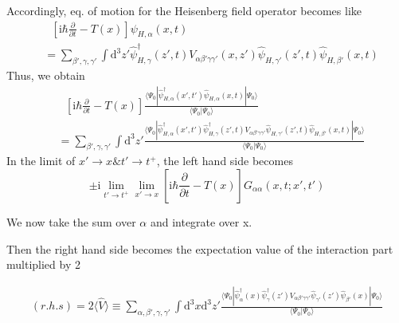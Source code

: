 Accordingly, eq. of motion for the Heisenberg field operator becomes like 
\begin{align}
&\ \ \ [\mathrm{i}\hbar\frac{\partial}{\partial t}-T(x)]\psi_{H,\alpha}(x,t)\nonumber \\
&=\sum_{\beta',\gamma,\gamma'}\int \mathrm{d}^3z'\hat \psi^{\dagger}_{H,\gamma}(z',t)V_{\alpha\beta'\gamma\gamma'}(x,z')\hat \psi_{H,\gamma'}(z',t)\hat \psi_{H,\beta'}(x,t) \nonumber
\end{align}
Thus, we obtain 
\begin{align}\label{2.3.4}
&\ \ \ [\mathrm{i}\hbar\frac{\partial}{\partial t}-T(x)]\frac{\langle\Psi_0|\hat \psi^{
\dagger}_{H,\alpha}(x',t')\hat \psi_{H,\alpha} (x,t)|\Psi_0\rangle}{\langle\Psi_0|\Psi_0\rangle}\nonumber \\
&=\sum_{\beta',\gamma,\gamma'}\int \mathrm{d}^3z'\frac{\langle\Psi_0|
\hat \psi^{\dagger}_{H,\alpha}(x',t')\hat \psi^{\dagger}_{H,\gamma}(z',t)V_{\alpha\beta'\gamma\gamma'}\hat\psi_{H,\gamma'}(z',t)\hat\psi_{H,\beta'}(x,t)
|\Psi_0\rangle}{\langle\Psi_0|\Psi_0\rangle} 
\end{align}
In the limit of $x' \rightarrow x \& t' \rightarrow t^+$, the left hand side becomes
\begin{equation}
\pm \mathrm{i} \lim_{t' \rightarrow t^+} \lim_{x' \rightarrow x} [\mathrm{i}\hbar\frac{\partial}{\partial t}-T(x)] G_{\alpha\alpha}(x,t;x',t') \nonumber
\end{equation}

We now take the sum over $\alpha$ and integrate over x.

Then the right hand side becomes the expectation value of the interaction part multiplied by 2

\begin{align}
(r.h.s)=2\langle\hat V\rangle \equiv \sum_{\alpha,\beta',\gamma,\gamma'}\int \mathrm{d}^3x\mathrm{d}^3z'\frac{\langle\Psi_0|
\hat \psi^{\dagger}_{\alpha}(x)\hat \psi^{\dagger}_{\gamma}(z')V_{\alpha\beta'\gamma\gamma'}\hat\psi_{\gamma'}(z')\hat\psi_{\beta'}(x)
|\Psi_0\rangle}{\langle\Psi_0|\Psi_0\rangle} \nonumber
\end{align}

